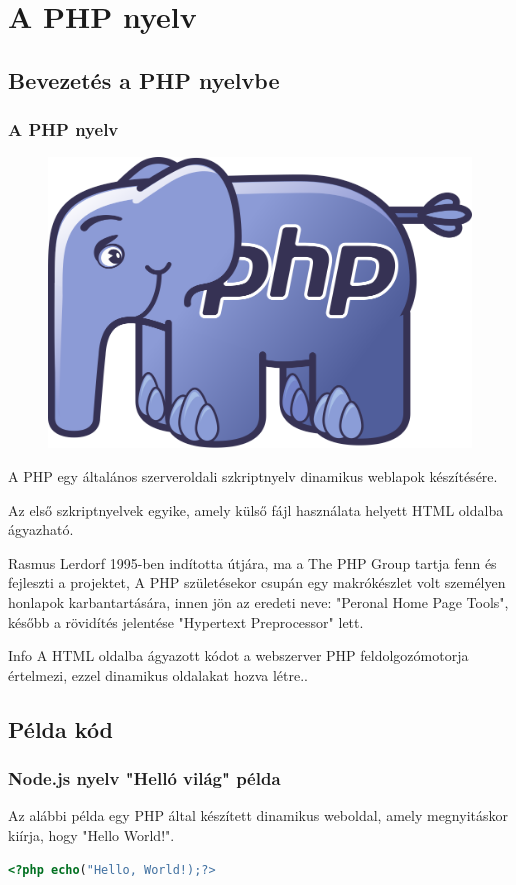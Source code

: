 \documentclass[10pt]{beamer}
\begin{document}
	\transboxin
	\section{A PHP nyelv}
	\subsection{Bevezetés a PHP nyelvbe}
	\begin{frame}
		\frametitle{A PHP nyelv}
		\hypertarget{php}{}

		\begin{figure}
			\includegraphics[height=0.15\textwidth]{php-logo.png} %
		\end{figure}

		\hspace{0.25cm} A PHP egy általános szerveroldali szkriptnyelv dinamikus weblapok
		készítésére. \pause

		\vspace{0.5cm}
		\hspace{0.25cm} Az első szkriptnyelvek egyike, amely külső fájl használata
		helyett HTML oldalba ágyazható. \pause

		\vspace{0.5cm}
		\hspace{0.25cm} Rasmus Lerdorf 1995-ben indította útjára, ma a The PHP Group
		tartja fenn és fejleszti a projektet, A PHP születésekor csupán egy
		makrókészlet volt személyen honlapok karbantartására, innen jön az eredeti neve:
		"Peronal Home Page Tools", később a rövidítés jelentése "Hypertext
		Preprocessor" lett. \pause

		\vspace{1cm}
		\begin{block}{Info}
			A HTML oldalba ágyazott kódot a webszerver PHP feldolgozómotorja értelmezi,
			ezzel dinamikus oldalakat hozva létre..
		\end{block}
	\end{frame}

	\subsection{Példa kód}
	\begin{frame}[fragile]
		\frametitle{Node.js nyelv "Helló világ" példa}

		Az alábbi példa egy PHP által készített dinamikus weboldal, amely megnyitáskor
		kiírja, hogy "Hello World!".
		\begin{lstlisting}[language=PHP]
  <?php echo("Hello, World!);?>
\end{lstlisting}
	\end{frame}
\end{document}
